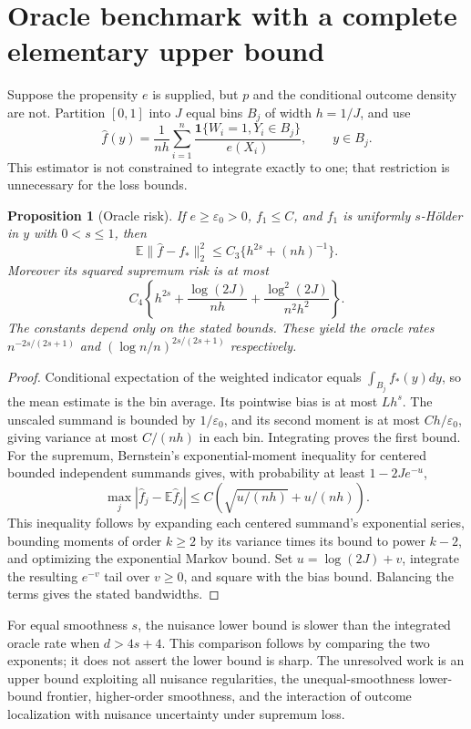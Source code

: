 \documentclass[11pt,a4paper]{article}
\newtheorem{proposition}[theorem]{Proposition}
\theoremstyle{remark}
\newcommand{\E}{\mathbb E}
\newcommand{\ind}{\mathbf 1}
\begin{document}
\section{Oracle benchmark with a complete elementary upper bound}
Suppose the propensity $e$ is supplied, but $p$ and the conditional outcome density are not. Partition $[0,1]$ into $J$ equal bins $B_j$ of width $h=1/J$, and use
\[
 \widehat f(y)=\frac1{nh}\sum_{i=1}^n
 \frac{\ind\{W_i=1,Y_i\in B_j\}}{e(X_i)},\qquad y\in B_j.
\]
This estimator is not constrained to integrate exactly to one; that restriction is unnecessary for the loss bounds.

\begin{proposition}[Oracle risk]
If $e\ge\varepsilon_0>0$, $f_1\le C$, and $f_1$ is uniformly $s$-H\"older in $y$ with $0<s\le1$, then
\[
 \E\|\widehat f-f_*\|_2^2\le C_3\{h^{2s}+(nh)^{-1}\}.
\]
Moreover its squared supremum risk is at most
\[
 C_4\left\{h^{2s}+\frac{\log(2J)}{nh}
 +\frac{\log^2(2J)}{n^2h^2}\right\}.
\]
The constants depend only on the stated bounds. These yield the oracle rates $n^{-2s/(2s+1)}$ and $(\log n/n)^{2s/(2s+1)}$ respectively.
\end{proposition}
\begin{proof}
Conditional expectation of the weighted indicator equals $\int_{B_j}f_*(y)dy$, so the mean estimate is the bin average. Its pointwise bias is at most $Lh^s$. The unscaled summand is bounded by $1/\varepsilon_0$, and its second moment is at most $Ch/\varepsilon_0$, giving variance at most $C/(nh)$ in each bin. Integrating proves the first bound.
For the supremum, Bernstein's exponential-moment inequality for centered bounded independent summands gives, with probability at least $1-2Je^{-u}$,
\[
 \max_j|\widehat f_j-\E\widehat f_j|
 \le C\left(\sqrt{u/(nh)}+u/(nh)\right).
\]
This inequality follows by expanding each centered summand's exponential series, bounding moments of order $k\ge2$ by its variance times its bound to power $k-2$, and optimizing the exponential Markov bound. Set $u=\log(2J)+v$, integrate the resulting $e^{-v}$ tail over $v\ge0$, and square with the bias bound. Balancing the terms gives the stated bandwidths.
\end{proof}

For equal smoothness $s$, the nuisance lower bound is slower than the integrated oracle rate when $d>4s+4$. This comparison follows by comparing the two exponents; it does not assert the lower bound is sharp. The unresolved work is an upper bound exploiting all nuisance regularities, the unequal-smoothness lower-bound frontier, higher-order smoothness, and the interaction of outcome localization with nuisance uncertainty under supremum loss.
\end{document}
